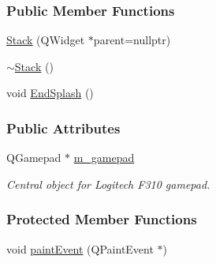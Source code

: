 \subsubsection*{Public Member Functions}
\begin{DoxyCompactItemize}
\item 
\mbox{\hyperlink{classStack_aa9d4cb23f0d4ade8db1df8624629cc14}{Stack}} (Q\+Widget $\ast$parent=nullptr)
\item 
\mbox{\hyperlink{classStack_a40bd5dff912f0e5290777c4b46d17809}{$\sim$\+Stack}} ()
\item 
void \mbox{\hyperlink{classStack_ac608632a7155f01a24a9713f5fde915e}{End\+Splash}} ()
\end{DoxyCompactItemize}
\subsubsection*{Public Attributes}
\begin{DoxyCompactItemize}
\item 
Q\+Gamepad $\ast$ \mbox{\hyperlink{classStack_a63dddeeffcc3340219b93b716f9b8bc9}{m\+\_\+gamepad}}
\begin{DoxyCompactList}\small\item\em Central object for Logitech F310 gamepad. \end{DoxyCompactList}\end{DoxyCompactItemize}
\subsubsection*{Protected Member Functions}
\begin{DoxyCompactItemize}
\item 
void \mbox{\hyperlink{classStack_a58526db5899d5e03a6ad306a96f91d62}{paint\+Event}} (Q\+Paint\+Event $\ast$)
\end{DoxyCompactItemize}
